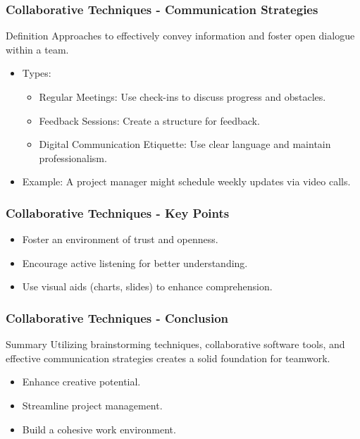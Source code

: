 \documentclass{beamer}
\begin{document}
\begin{frame}[fragile]
    \frametitle{Collaborative Techniques - Communication Strategies}
    \begin{block}{Definition}
        Approaches to effectively convey information and foster open dialogue within a team.
    \end{block}
    \begin{itemize}
        \item Types:
        \begin{itemize}
            \item Regular Meetings: Use check-ins to discuss progress and obstacles.
            \item Feedback Sessions: Create a structure for feedback.
            \item Digital Communication Etiquette: Use clear language and maintain professionalism.
        \end{itemize}
        \item Example: A project manager might schedule weekly updates via video calls.
    \end{itemize}
\end{frame}

\begin{frame}[fragile]
    \frametitle{Collaborative Techniques - Key Points}
    \begin{itemize}
        \item Foster an environment of trust and openness.
        \item Encourage active listening for better understanding.
        \item Use visual aids (charts, slides) to enhance comprehension.
    \end{itemize}
\end{frame}

\begin{frame}[fragile]
    \frametitle{Collaborative Techniques - Conclusion}
    \begin{block}{Summary}
        Utilizing brainstorming techniques, collaborative software tools, and effective communication strategies creates a solid foundation for teamwork.
    \end{block}
    \begin{itemize}
        \item Enhance creative potential.
        \item Streamline project management.
        \item Build a cohesive work environment.
    \end{itemize}
\end{frame}
\end{document}

